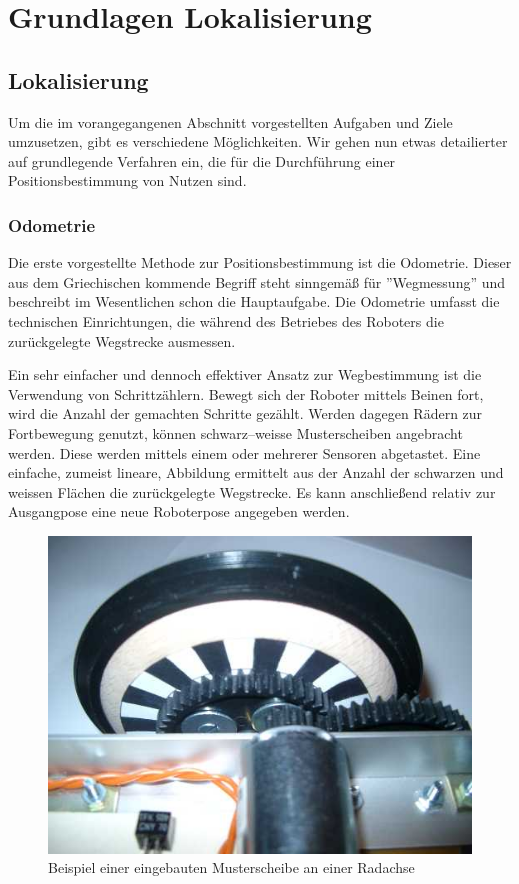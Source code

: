 \section{Grundlagen Lokalisierung}
\label{lokalisierung_grundlagen_sec}
\authorsection{\editoranne, \editordirk}
\subsection{Lokalisierung}
Um die im vorangegangenen Abschnitt vorgestellten Aufgaben und Ziele umzusetzen, gibt es verschiedene Möglichkeiten. Wir gehen nun etwas detailierter auf grundlegende Verfahren ein, die für die Durchführung einer Positionsbestimmung von Nutzen sind.
 
\subsubsection{Odometrie}
Die erste vorgestellte Methode zur Positionsbestimmung ist die Odometrie. Dieser
aus dem Griechischen kommende Begriff steht sinngemäß für ''Wegmessung'' und beschreibt im Wesentlichen schon die Hauptaufgabe. Die Odometrie umfasst die technischen Einrichtungen, die während des Betriebes des Roboters die zurückgelegte Wegstrecke ausmessen.

Ein sehr einfacher und dennoch effektiver Ansatz zur Wegbestimmung ist die Verwendung von Schrittzählern. Bewegt sich der Roboter mittels Beinen fort, wird die Anzahl der gemachten Schritte gezählt. Werden dagegen Rädern  zur Fortbewegung genutzt, können schwarz--weisse Musterscheiben angebracht werden. Diese werden mittels einem oder mehrerer Sensoren abgetastet. Eine einfache, zumeist lineare, Abbildung ermittelt aus der Anzahl der schwarzen und weissen Flächen die zurückgelegte Wegstrecke. Es kann anschließend relativ zur Ausgangpose eine neue Roboterpose angegeben werden.

\begin{figure}[h]
\center
\includegraphics[scale=0.5]{graphics/odo_einbau.jpg}
\caption{\label{fig:Odo_Einbau} Beispiel einer eingebauten Musterscheibe an einer Radachse\citep{odom}}
\end{figure}


